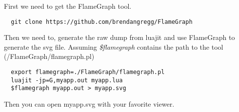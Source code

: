 First we need to get the FlameGraph tool.
\begin{center}
\begin{lstlisting}
  git clone https://github.com/brendangregg/FlameGraph
\end{lstlisting}
\end{center}
Then we need to, generate the raw dump from luajit and use FlameGraph to generate
the svg file. Assuming \emph{\$flamegraph} contains the path to the tool (/FlameGraph/flamegraph.pl)

\begin{center}
\begin{lstlisting}
  export flamegraph=./FlameGraph/flamegraph.pl
  luajit -jp=G,myapp.out myapp.lua
  $flamegraph myapp.out > myapp.svg
\end{lstlisting}
\end{center}
Then you can open myapp.svg with your favorite viewer.
